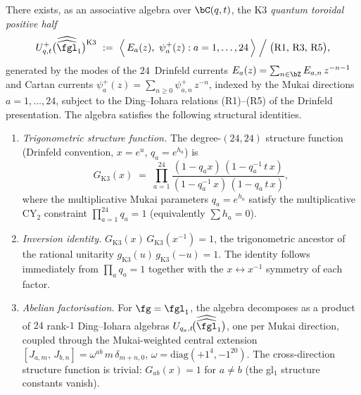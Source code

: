 \begin{theorem}
\label{thm:k3-quantum-toroidal-abelian}
\label{conj:k3-quantum-toroidal}%
\ClaimStatusProvedHere
There exists, as an associative algebra over $\bC(q, t)$, the
\emph{$\mathrm{K}3$ quantum toroidal positive half}
\[
  U^+_{q,t}\bigl(\widehat{\widehat{\fgl}}_1\bigr)^{\mathrm{K}3}
  \ := \
  \Bigl\langle\, E_a(z),\ \psi^+_a(z) : a = 1, \ldots, 24 \,\Bigr\rangle
  \;\Big/\;\bigl(\textup{R1, R3, R5}\bigr),
\]
generated by the modes of the $24$~Drinfeld currents
$E_a(z) = \sum_{n \in \bZ} E_{a,n}\, z^{-n-1}$ and Cartan currents
$\psi^+_a(z) = \sum_{n \geq 0} \psi^+_{a,n}\, z^{-n}$, indexed by the
Mukai directions $a = 1, \ldots, 24$, subject to the Ding--Iohara
relations \textup{(R1)--(R5)} of the Drinfeld presentation.  The algebra
satisfies the following structural identities.
\begin{enumerate}[label=\textup{(\roman*)}]
\item \emph{Trigonometric structure function.}
The degree-$(24,24)$ structure function (Drinfeld convention,
$x = e^u$, $q_a = e^{h_a}$) is
\begin{equation}\label{eq:k3-qt-structure-fn-thm}
  G_{\mathrm{K}3}(x)
  \;=\; \prod_{a=1}^{24}
  \frac{(1 - q_a x)\,(1 - q_a^{-1}\, t\, x)}{(1 - q_a^{-1}\, x)\,(1 - q_a\, t\, x)},
\end{equation}
where the multiplicative Mukai parameters $q_a = e^{h_a}$ satisfy the
multiplicative CY$_2$ constraint $\prod_{a=1}^{24} q_a = 1$ (equivalently
$\sum h_a = 0$).

\item \emph{Inversion identity.}
$G_{\mathrm{K}3}(x)\, G_{\mathrm{K}3}(x^{-1}) = 1$, the trigonometric
ancestor of the rational unitarity $g_{\mathrm{K}3}(u)\, g_{\mathrm{K}3}(-u) = 1$.
The identity follows immediately from $\prod_a q_a = 1$ together with the
$x \leftrightarrow x^{-1}$ symmetry of each factor.

\item \emph{Abelian factorisation.}
For $\fg = \fgl_1$, the algebra decomposes as a product of $24$ rank-$1$
Ding--Iohara algebras $U_{q_a, t}\!\bigl(\widehat{\widehat{\fgl}}_1\bigr)$,
one per Mukai direction, coupled through the Mukai-weighted central
extension $[J_{a,m},\, J_{b,n}] = \omega^{ab}\, m\, \delta_{m+n,0}$,
$\omega = \mathrm{diag}(+1^4, -1^{20})$.  The cross-direction structure
function is trivial: $G_{ab}(x) = 1$ for $a \neq b$ (the gl$_1$ structure
constants vanish).


\end{enumerate}
\end{theorem}
